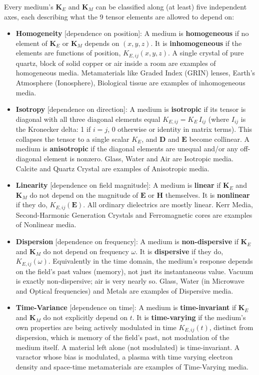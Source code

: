 Every medium's \( \mathbf{K}_E \) and \( \mathbf{K}_M \) can be
classified along (at least) five independent axes, each describing what the
9 tensor elements are allowed to depend on:
\begin{itemize}
  \item \textbf{Homogeneity} [dependence on position]: A medium is
    \textbf{homogeneous} if no element of \( \mathbf{K}_E \) or
    \( \mathbf{K}_M \) depends on \( (x,y,z) \). It is
    \textbf{inhomogeneous} if the elements are functions of position,
    \( K_{E,ij}(x,y,z) \). A single crystal of pure quartz, block
    of solid copper or air inside a room are examples of homogeneous media.
    Metamaterials like Graded Index (GRIN) lenses, Earth's Atmosphere
    (Ionosphere), Biological tissue are examples of inhomogeneous media.
  \item \textbf{Isotropy} [dependence on direction]: A medium is
    \textbf{isotropic} if its tensor is diagonal with all three diagonal
    elements equal \( K_{E,ij} = K_E \, I_{ij} \) (where
    \( I_{ij} \) is the Kronecker delta: 1 if \( i=j \), 0 otherwise or
    identity in matrix terms). This collapses the tensor to a single scalar
    \( K_E \), and \( \mathbf{D} \) and \( \mathbf{E} \) become
    collinear. A medium is \textbf{anisotropic} if the diagonal elements
    are unequal and/or any off-diagonal element is nonzero. Glass, Water
    and Air are Isotropic media. Calcite and Quartz Crystal are examples
    of Anisotropic media.
  \item \textbf{Linearity} [dependence on field magnitude]: A medium is
    \textbf{linear} if \( \mathbf{K}_E \) and \( \mathbf{K}_M \)
    do not depend on the magnitude of \( \mathbf{E} \) or \( \mathbf{H} \)
    themselves. It is \textbf{nonlinear} if they do, \( K_{E,ij}(\mathbf{E}) \).
    All ordinary dielectrics are mostly linear. Kerr Media, Second-Harmonic Generation
    Crystals and Ferromagnetic cores are examples of Nonlinear media.
  \item \textbf{Dispersion} [dependence on frequency]: A medium is
    \textbf{non-dispersive} if \( \mathbf{K}_E \) and
    \( \mathbf{K}_M \) do not depend on frequency \( \omega \). It is
    \textbf{dispersive} if they do, \( K_{E,ij}(\omega) \). Equivalently in
    the time domain, the medium's response depends on the field's past
    values (memory), not just its instantaneous value. Vacuum is exactly
    non-dispersive; air is very nearly so. Glass, Water (in Microwave and
    Optical frequencies) and Metals are examples of Dispersive media.
  \item \textbf{Time-Variance} [dependence on time]: A medium is
    \textbf{time-invariant} if \( \mathbf{K}_E \) and
    \( \mathbf{K}_M \) do not explicitly depend on \( t \). It is
    \textbf{time-varying} if the medium's own properties are being actively
    modulated in time \( K_{E,ij}(t) \), distinct from dispersion,
    which is memory of the field's past, not modulation of the medium
    itself. A material left alone (not modulated) is time-invariant. A
    varactor whose bias is modulated, a plasma with time varying electron
    density and space-time metamaterials are examples of Time-Varying media.
\end{itemize}
